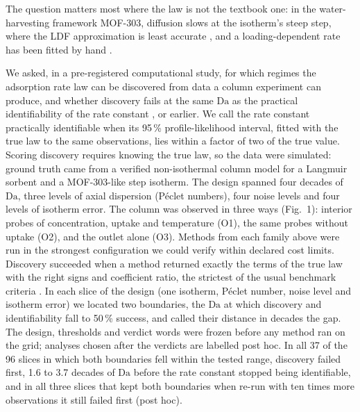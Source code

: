 \documentclass[11pt]{article}
\newcommand{\Da}{\mathrm{Da}}
\begin{document}
The question matters most where the law is not the textbook one: in the water-harvesting framework MOF-303,
diffusion slows at the isotherm's steep step, where the LDF approximation is least accurate \citep{lassitter2024,hastings2024}, and a
loading-dependent rate has been fitted by hand \citep{abuelmaaty2024}.

We asked, in a pre-registered computational study, for which regimes the adsorption rate law
can be discovered from data a column experiment can produce, and whether discovery fails at the
same $\Da$ as the practical identifiability of the rate constant \citep{raue2009}, or
earlier. We call the rate constant practically identifiable when its 95\,\% profile-likelihood
interval, fitted with the true law to the same observations, lies within a factor of two of the true value. Scoring discovery requires knowing the true law, so the data
were simulated: ground truth came from a verified non-isothermal column model
\citep{paper1} for a Langmuir sorbent and a MOF-303-like step isotherm. The design spanned four
decades of $\Da$, three levels of axial dispersion (P\'eclet numbers), four noise levels and four
levels of isotherm error. The column was observed in three ways (Fig.~1): interior probes of
concentration, uptake and temperature (O1), the same probes without uptake (O2), and the outlet
alone (O3). Methods from each family above were run in the
strongest configuration we could verify within declared cost limits. Discovery succeeded when a method returned exactly the terms of the true law with the right signs and
coefficient ratio, the strictest of the usual benchmark criteria \citep{defranca2025}. In each slice of the
design (one isotherm, P\'eclet number, noise level and isotherm error) we located two boundaries,
the $\Da$ at which discovery and identifiability fall to 50\,\% success, and called their distance
in decades the gap.
The design, thresholds and verdict words were frozen before any method ran on the grid;
analyses chosen after the verdicts are labelled post hoc. In all 37 of the 96 slices in which both boundaries fell within the tested range, discovery failed
first, 1.6 to 3.7 decades of $\Da$ before the rate constant stopped being identifiable, and in all
three slices that kept both boundaries when re-run with ten times more observations it still failed first (post hoc).
\end{document}
